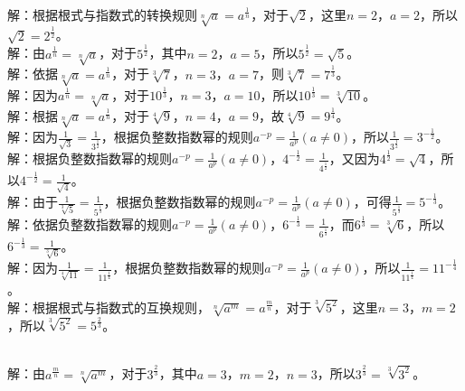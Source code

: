 \begin{MyAnswer}[ref={ex:basic - radical - exponential}]
    \Question {}\\
    解：根据根式与指数式的转换规则\(\sqrt[n]{a}=a^{\frac{1}{n}}\)，对于\(\sqrt{2}\)，这里\(n = 2\)，\(a = 2\)，所以\(\sqrt{2}=2^{\frac{1}{2}}\)。
    \Question {}\\
    解：由\(a^{\frac{1}{n}}=\sqrt[n]{a}\)，对于\(5^{\frac{1}{2}}\)，其中\(n = 2\)，\(a = 5\)，所以\(5^{\frac{1}{2}}=\sqrt{5}\)。
    \Question {}\\
    解：依据\(\sqrt[n]{a}=a^{\frac{1}{n}}\)，对于\(\sqrt[3]{7}\)，\(n = 3\)，\(a = 7\)，则\(\sqrt[3]{7}=7^{\frac{1}{3}}\)。
    \Question {}\\
    解：因为\(a^{\frac{1}{n}}=\sqrt[n]{a}\)，对于\(10^{\frac{1}{3}}\)，\(n = 3\)，\(a = 10\)，所以\(10^{\frac{1}{3}}=\sqrt[3]{10}\)。
    \Question {}\\
    解：根据\(\sqrt[n]{a}=a^{\frac{1}{n}}\)，对于\(\sqrt[4]{9}\)，\(n = 4\)，\(a = 9\)，故\(\sqrt[4]{9}=9^{\frac{1}{4}}\)。
    \Question {}\\
    解：因为\(\frac{1}{\sqrt{3}}=\frac{1}{3^{\frac{1}{2}}}\)，根据负整数指数幂的规则\(a^{-p}=\frac{1}{a^{p}}(a\neq0)\)，所以\(\frac{1}{3^{\frac{1}{2}}}=3^{-\frac{1}{2}}\)。
    \Question {}\\
    解：根据负整数指数幂的规则\(a^{-p}=\frac{1}{a^{p}}(a\neq0)\)，\(4^{-\frac{1}{2}}=\frac{1}{4^{\frac{1}{2}}}\)，又因为\(4^{\frac{1}{2}}=\sqrt{4}\)，所以\(4^{-\frac{1}{2}}=\frac{1}{\sqrt{4}}\)。
    \Question {}\\
    解：由于\(\frac{1}{\sqrt[3]{5}}=\frac{1}{5^{\frac{1}{3}}}\)，根据负整数指数幂的规则\(a^{-p}=\frac{1}{a^{p}}(a\neq0)\)，可得\(\frac{1}{5^{\frac{1}{3}}}=5^{-\frac{1}{3}}\)。
    \Question {}\\
    解：依据负整数指数幂的规则\(a^{-p}=\frac{1}{a^{p}}(a\neq0)\)，\(6^{-\frac{1}{3}}=\frac{1}{6^{\frac{1}{3}}}\)，而\(6^{\frac{1}{3}}=\sqrt[3]{6}\)，所以\(6^{-\frac{1}{3}}=\frac{1}{\sqrt[3]{6}}\)。
    \Question {}\\
    解：因为\(\frac{1}{\sqrt[4]{11}}=\frac{1}{11^{\frac{1}{4}}}\)，根据负整数指数幂的规则\(a^{-p}=\frac{1}{a^{p}}(a\neq0)\)，所以\(\frac{1}{11^{\frac{1}{4}}}=11^{-\frac{1}{4}}\)。
    \Question {}\\ 解：根据根式与指数式的互换规则，\(\sqrt[n]{a^m}=a^{\frac{m}{n}}\)，对于\(\sqrt[3]{5^2}\)，这里\(n = 3\)，\(m = 2\)，所以\(\sqrt[3]{5^2}=5^{\frac{2}{3}}\)。

    \Question {}\\ 解：由\(a^{\frac{m}{n}}=\sqrt[n]{a^m}\)，对于\(3^{\frac{2}{3}}\)，其中\(a = 3\)，\(m = 2\)，\(n = 3\)，所以\(3^{\frac{2}{3}}=\sqrt[3]{3^2}\)。

\end{MyAnswer}





